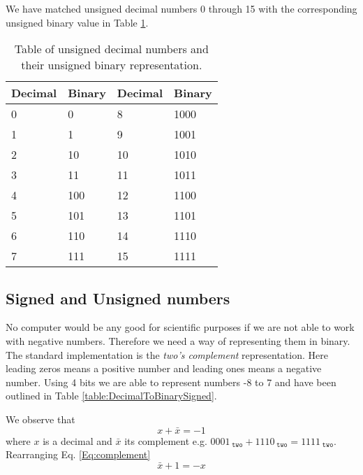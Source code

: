    We have matched unsigned decimal numbers 0 through 15 with the corresponding unsigned binary value in Table \ref{table:DecimalToBinaryUnsigned}.
    
    \begin{table}[h!]
        \centering
        \begin{tabular}{|l|l||l|l|}
        	\hline
        	Decimal & Binary & Decimal & Binary \\ \hline
        	0       & 0      & 8       & 1000   \\
        	1       & 1      & 9       & 1001   \\
        	2       & 10     & 10      & 1010   \\
        	3       & 11     & 11      & 1011   \\
        	4       & 100    & 12      & 1100   \\
        	5       & 101    & 13      & 1101   \\
        	6       & 110    & 14      & 1110   \\
        	7       & 111    & 15      & 1111   \\ \hline
        \end{tabular}
        \caption{Table of unsigned decimal numbers and their unsigned binary representation.}
        \label{table:DecimalToBinaryUnsigned}
    \end{table} 
    
    \subsection{Signed and Unsigned numbers}
        No computer would be any good for scientific purposes if we are not able to work with negative numbers. Therefore we need a way of representing them in binary. The standard implementation is the \textit{two's complement} representation. Here leading zeros means a positive number and leading ones means a negative number. Using 4 bits we are able to represent numbers -8 to 7 and have been outlined in Table \ref{table:DecimalToBinarySigned}. 
        
        We observe that 
        \begin{equation}\label{Eq:complement}
            x + \bar{x} = -1
        \end{equation}
        where $x$ is a decimal and $\bar{x}$ its complement e.g. $0001_{\; \texttt{two}}+1110_{\; \texttt{two}}=1111_{\; \texttt{two}}$. Rearranging Eq. \ref{Eq:complement}
        \begin{equation}
        \bar{x} + 1 = -x
        \end{equation}
        
